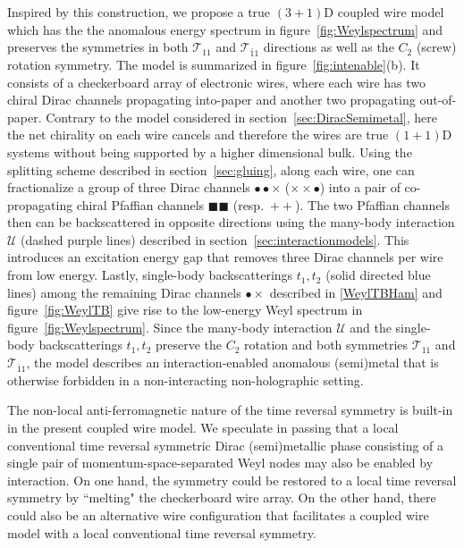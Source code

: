Inspired by this construction, we propose a true $(3+1)$D coupled wire model which has the the anomalous energy spectrum in figure~\ref{fig:Weylspectrum} and preserves the \AFTR symmetries in both $\mathcal{T}_{11}$ and $\mathcal{T}_{\bar{1}1}$ directions as well as the $C_2$ (screw) rotation symmetry. The model is summarized in figure~\ref{fig:intenable}(b). It consists of a checkerboard array of electronic wires, where each wire has two chiral Dirac channels propagating into-paper and another two propagating out-of-paper. Contrary to the model considered in section~\ref{sec:DiracSemimetal}, here the net chirality on each wire cancels and therefore the wires are true $(1+1)$D systems without being supported by a higher dimensional bulk. Using the splitting scheme described in section~\ref{sec:gluing}, along each wire, one can fractionalize a group of three Dirac channels {\color{red}$\bullet\bullet\times$} ({\color{red}$\times\times\bullet$}) into a pair of co-propagating chiral Pfaffian channels {\color{green}$\blacksquare\blacksquare$} (resp.~{\color{green}$++$}). The two Pfaffian channels then can be backscattered in opposite directions using the many-body interaction $\mathcal{U}$ (dashed purple lines) described in section~\ref{sec:interactionmodels}. This introduces an excitation energy gap that removes three Dirac channels per wire from low energy. Lastly, single-body backscatterings $t_1,t_2$ (solid directed blue lines) among the remaining Dirac channels {\color{blue}$\bullet\times$} described in \eqref{WeylTBHam} and figure~\ref{fig:WeylTB} give rise to the low-energy Weyl spectrum in figure~\ref{fig:Weylspectrum}. Since the many-body interaction $\mathcal{U}$ and the single-body backscatterings $t_1,t_2$ preserve the $C_2$ rotation and both \AFTR symmetries $\mathcal{T}_{11}$ and $\mathcal{T}_{\bar{1}1}$, the model describes an interaction-enabled anomalous (semi)metal that is otherwise forbidden in a non-interacting non-holographic setting. 

The non-local anti-ferromagnetic nature of the time reversal symmetry is built-in in the present coupled wire model. We speculate in passing that a local conventional time reversal symmetric Dirac (semi)metallic phase consisting of a single pair of momentum-space-separated Weyl nodes may also be enabled by interaction. On one hand, the \AFTR symmetry could be restored to a local time reversal symmetry by ``melting" the checkerboard wire array. On the other hand, there could also be an alternative wire configuration that facilitates a coupled wire model with a local conventional time reversal symmetry.

